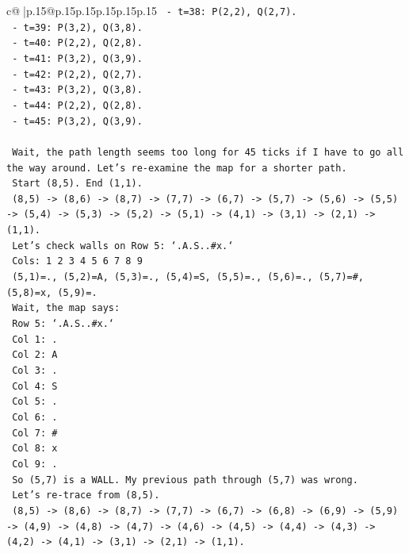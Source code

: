 \documentclass{article}
\begin{document}
{\begin{supertabular}{c@{$\;$}|p{.15\linewidth}@{}p{.15\linewidth}p{.15\linewidth}p{.15\linewidth}p{.15\linewidth}p{.15\linewidth}}
{{{\texttt{   {-} t=38: P(2,2), Q(2,7).} \\
\texttt{   {-} t=39: P(3,2), Q(3,8).} \\
\texttt{   {-} t=40: P(2,2), Q(2,8).} \\
\texttt{   {-} t=41: P(3,2), Q(3,9).} \\
\texttt{   {-} t=42: P(2,2), Q(2,7).} \\
\texttt{   {-} t=43: P(3,2), Q(3,8).} \\
\texttt{   {-} t=44: P(2,2), Q(2,8).} \\
\texttt{   {-} t=45: P(3,2), Q(3,9).} \\
\\ 
\texttt{   Wait, the path length seems too long for 45 ticks if I have to go all the way around. Let's re{-}examine the map for a shorter path.} \\
\texttt{   Start (8,5). End (1,1).} \\
\texttt{   (8,5) {-}> (8,6) {-}> (8,7) {-}> (7,7) {-}> (6,7) {-}> (5,7) {-}> (5,6) {-}> (5,5) {-}> (5,4) {-}> (5,3) {-}> (5,2) {-}> (5,1) {-}> (4,1) {-}> (3,1) {-}> (2,1) {-}> (1,1).} \\
\texttt{   Let's check walls on Row 5: `.A.S..\#x.`} \\
\texttt{   Cols: 1 2 3 4 5 6 7 8 9} \\
\texttt{   (5,1)=., (5,2)=A, (5,3)=., (5,4)=S, (5,5)=., (5,6)=., (5,7)=\#, (5,8)=x, (5,9)=.} \\
\texttt{   Wait, the map says:} \\
\texttt{   Row 5: `.A.S..\#x.`} \\
\texttt{   Col 1: .} \\
\texttt{   Col 2: A} \\
\texttt{   Col 3: .} \\
\texttt{   Col 4: S} \\
\texttt{   Col 5: .} \\
\texttt{   Col 6: .} \\
\texttt{   Col 7: \#} \\
\texttt{   Col 8: x} \\
\texttt{   Col 9: .} \\
\texttt{   So (5,7) is a WALL. My previous path through (5,7) was wrong.} \\
\texttt{   Let's re{-}trace from (8,5).} \\
\texttt{   (8,5) {-}> (8,6) {-}> (8,7) {-}> (7,7) {-}> (6,7) {-}> (6,8) {-}> (6,9) {-}> (5,9) {-}> (4,9) {-}> (4,8) {-}> (4,7) {-}> (4,6) {-}> (4,5) {-}> (4,4) {-}> (4,3) {-}> (4,2) {-}> (4,1) {-}> (3,1) {-}> (2,1) {-}> (1,1).} \\
}}}
\end{supertabular}}
\end{document}
